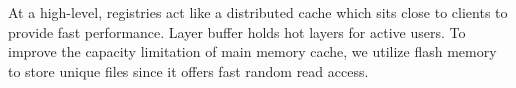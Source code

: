 At a high-level, registries act like a distributed cache which sits close to clients to provide fast performance. 
Layer buffer holds hot layers for active users.
To improve the capacity limitation of main memory cache, we utilize flash memory to store unique files since it offers fast random read access.
